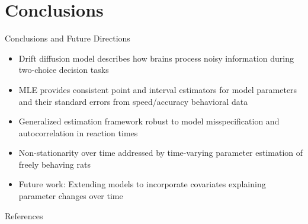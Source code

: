\documentclass[8pt]{beamer}
\begin{document}
\section{Conclusions}

\begin{frame}{Conclusions and Future Directions}
    \begin{itemize}
        \item Drift diffusion model describes how brains process noisy information during two-choice decision tasks \vspace{0.25cm}
        
        \item MLE provides consistent point and interval estimators for model parameters and their standard errors from speed/accuracy behavioral data \vspace{0.25cm}
        
        \item Generalized estimation framework robust to model misspecification and autocorrelation in reaction times \vspace{0.25cm}
        
        \item Non-stationarity over time addressed by time-varying parameter estimation of freely behaving rats \vspace{0.25cm}
        
        \item Future work: Extending models to incorporate covariates explaining parameter changes over time
    \end{itemize}
\end{frame}

\begin{frame}{References}
    \small
    
\end{frame}
\end{document}
